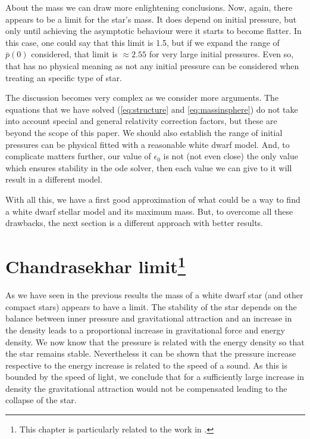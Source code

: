 \documentclass[a4paper]{article}
\begin{document}
About the mass we can draw more enlightening conclusions. Now, again, there appears to be a limit for the star's mass. It does depend on initial pressure, but only until achieving the asymptotic behaviour were it starts to become flatter. In this case, one could say that this limit is 1.5, but if we expand the range of $\bar{p}(0)$ considered, that limit is $\approx 2.55$ for very large initial pressures. Even so, that has no physical meaning as not any initial pressure can be considered when treating an specific type of star. 

The discussion becomes very complex as we consider more arguments. The equations that we have solved (\eqref{eq:structure} and \eqref{eq:massinsphere}) do not take into account special and general relativity correction factors, but these are beyond the scope of this paper. We should also establish the range of initial pressures can be physical fitted with a reasonable white dwarf model. And, to complicate matters further, our value of $\epsilon_0$ is not (not even close) the only value which ensures stability in the ode solver, then each value we can give to it will result in a different model.

With all this, we have a first good approximation of what could be a way to find a white dwarf stellar model and its maximum mass. But, to overcome all these drawbacks, the next section is a different approach with better results.


\section[Chandrasekhar limit]{Chandrasekhar limit\footnote{This chapter is particularly related to the work in \cite{silbarNeutronStarsUndergraduates2004}.}} \label{sec:chandrasekhar}
As we have seen in the previous results the mass of a white dwarf star (and other compact stars) appears to have a limit. The stability of the star depends on the balance between inner pressure and gravitational attraction and an increase in the density leads to a proportional increase in gravitational force and energy density. We now know that the pressure is related with the energy density so that the star remains stable. Nevertheless it can be shown \cite{silbarNeutronStarsUndergraduates2004} that the pressure increase respective to the energy increase is related to the speed of a sound. As this is bounded by the speed of light, we conclude that for a sufficiently large increase in density the gravitational attraction would not be compensated leading to the collapse of the star. 
\end{document}
